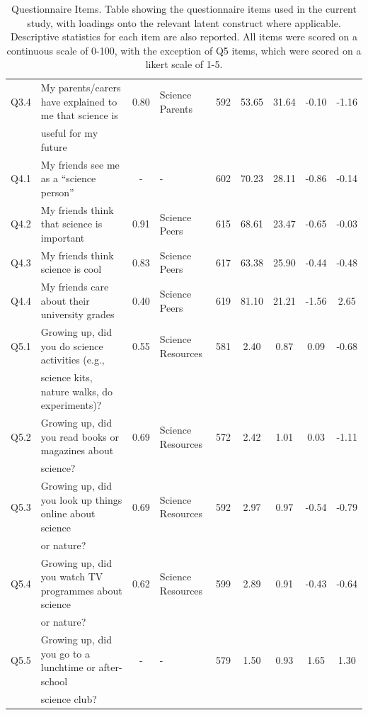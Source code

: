 \begin{landscape}
\begin{table}[ht]
\begin{tabular}[width = \textwidth]{clclccccc}
Q3.4 & My parents/carers have explained to me that science is & 0.80 & Science Parents & 592	&53.65	&31.64	& -0.10	&-1.16	\\  
&useful for my future&&&&&&&\\
  \hline
Q4.1 & My friends see me as a ``science person'' & - & - &  602	&70.23&	28.11 &-0.86&-0.14\\
Q4.2 & My friends think that science is important & 0.91 & Science Peers & 615&68.61&	23.47 & -0.65&-0.03 \\
Q4.3 & My friends think science is cool & 0.83 & Science Peers &617&63.38&25.90 & -0.44&-0.48\\ 
Q4.4 & My friends care about their university grades & 0.40 & Science Peers &619&	81.10&	21.21 &-1.56&2.65 \\
  \hline
Q5.1 & Growing up, did you do science activities (e.g.,  & 0.55 & Science Resources& 581	&2.40&0.87 & 0.09&-0.68 \\ 
&science kits, nature walks, do experiments)?&&&&&&&\\
Q5.2 & Growing up, did you read books or magazines about & 0.69 & Science Resources &572	&2.42&1.01 & 0.03&-1.11\\
&science?&&&&&&&\\
Q5.3 & Growing up, did you look up things online about science & 0.69 & Science Resources &592&2.97&0.97 &-0.54&-0.79	\\
&or nature?&&&&&&&\\
Q5.4 & Growing up, did you watch TV programmes about science & 0.62 & Science Resources &599&2.89&0.91 &-0.43&	-0.64\\
&or nature?&&&&&&&\\
Q5.5 & Growing up, did you go to a lunchtime or after-school & - &-&579&1.50&0.93 & 1.65&	1.30\\
&science club?&&&&&&&\\

   \hline
\end{tabular}
\caption{Questionnaire Items. Table showing the questionnaire items used in the current study, with loadings onto the relevant latent construct where applicable. Descriptive statistics for each item are also reported. All items were scored on a continuous scale of 0-100, with the exception of Q5 items, which were scored on a likert scale of 1-5.} 
\end{table}
\end{landscape}

